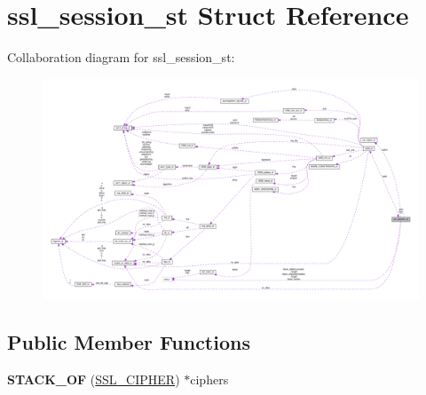\hypertarget{structssl__session__st}{}\section{ssl\+\_\+session\+\_\+st Struct Reference}
\label{structssl__session__st}


Collaboration diagram for ssl\+\_\+session\+\_\+st\+:
\nopagebreak
\begin{figure}[H]
\begin{center}
\leavevmode
\includegraphics[width=350pt]{structssl__session__st__coll__graph}
\end{center}
\end{figure}
\subsection*{Public Member Functions}
\begin{DoxyCompactItemize}
\item 
\mbox{\label{structssl__session__st_af03a63e995bab8b99b94d69e298b8e43}} 
{\bfseries S\+T\+A\+C\+K\+\_\+\+OF} (\hyperlink{structssl__cipher__st}{S\+S\+L\+\_\+\+C\+I\+P\+H\+ER}) $\ast$ciphers
\end{DoxyCompactItemize}
